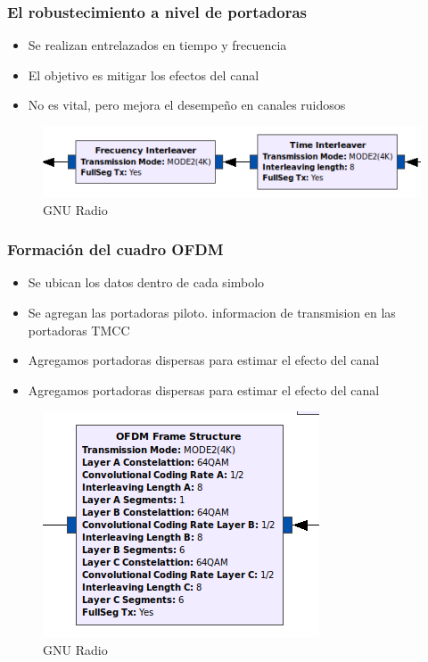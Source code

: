 \begin{frame}
\frametitle{El robustecimiento a nivel de portadoras}
\begin{itemize}	
	\item { Se realizan entrelazados en tiempo y frecuencia}
	\item {	El objetivo es mitigar los efectos del canal}
	\item { No es vital, pero mejora el desempeño en canales ruidosos }
\end{itemize}
\begin{figure}
	\includegraphics[scale=0.55]{rob_port}
	\caption{GNU Radio}
\end{figure}
\end{frame}
\begin{frame}
\frametitle{Formación del cuadro OFDM}
\begin{itemize}	
	\item { Se ubican los datos dentro de cada simbolo}
	\item {	Se agregan las portadoras piloto. informacion de transmision en las portadoras TMCC}
	\item { Agregamos portadoras dispersas para estimar el efecto del canal }
	\item { Agregamos portadoras dispersas para estimar el efecto del canal }
\end{itemize}
\begin{figure}
	\includegraphics[scale=0.4]{bloque_ofdm}
	\caption{GNU Radio}
\end{figure}
\end{frame}

